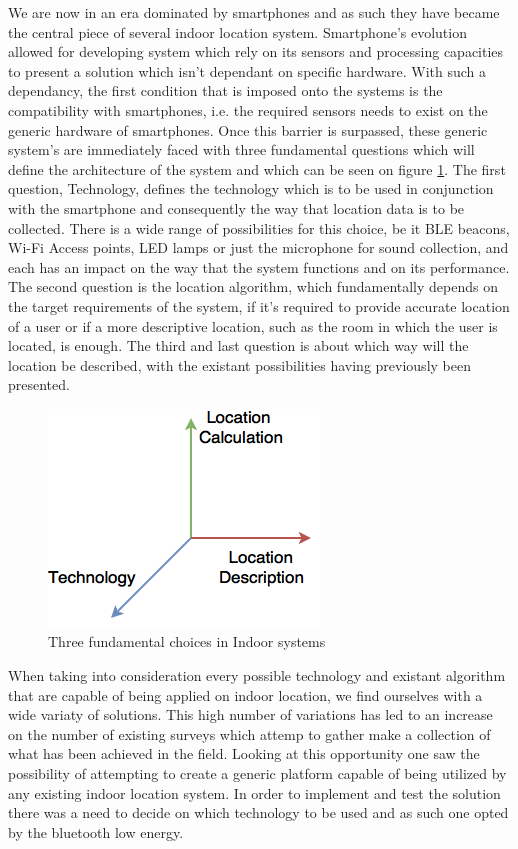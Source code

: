 \documentclass[a4paper]{IEEEtran}
\begin{document}
We are now in an era dominated by smartphones and as such they have became the central piece of several indoor location system. Smartphone's evolution allowed for developing system which rely on its sensors and processing capacities to present a solution which isn't dependant on specific hardware. With such a dependancy, the first condition that is imposed onto the systems is the compatibility with smartphones, i.e. the required sensors needs to exist on the generic hardware of smartphones. Once this barrier is surpassed, these generic system's are immediately faced with three fundamental questions which will define the architecture of the system and which can be seen on figure \ref{fig:choices}. The first question, Technology, defines the technology which is to be used in conjunction with the smartphone and consequently the way that location data is to be collected. There is a wide range of possibilities for this choice, be it BLE beacons, Wi-Fi Access points, LED lamps or just the microphone for sound collection, and each has an impact on the way that the system functions and on its performance. The second question is the location algorithm, which fundamentally depends on the target requirements of the system, if it's required to provide accurate location of a user or if a more descriptive location, such as the room in which the user is located, is enough. The third and last question is about which way will the location be described, with the existant possibilities having previously been presented. 

\begin{figure}[htp]
	\centering
		\includegraphics[width=0.5\linewidth]{figures/vectors.png}
	\caption[]{Three fundamental choices in Indoor systems}
	\label{fig:choices}
\end{figure}

When taking into consideration every possible technology and existant algorithm that are capable of being applied on indoor location, we find ourselves with a wide variaty of solutions. This high number of variations has led to an increase on the number of existing surveys which attemp to gather make a collection of what has been achieved in the field. Looking at this opportunity one saw the possibility of attempting to create a generic platform capable of being utilized by any existing indoor location system. In order to implement and test the solution there was a need to decide on which technology to be used and as such one opted by the bluetooth low energy.
\end{document}
